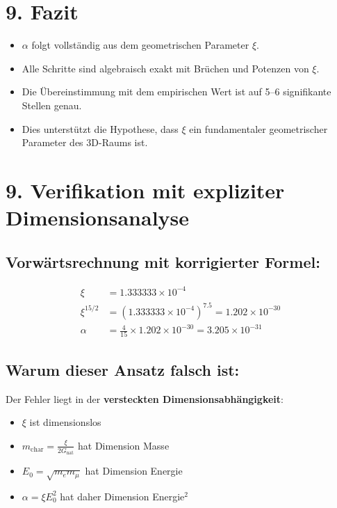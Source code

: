 \documentclass[12pt, a4paper]{article}
\begin{document}
\section*{9. Fazit}
\begin{itemize}
	\item $\alpha$ folgt vollständig aus dem geometrischen Parameter $\xi$.
	\item Alle Schritte sind algebraisch exakt mit Brüchen und Potenzen von $\xi$.
	\item Die Übereinstimmung mit dem empirischen Wert ist auf 5–6 signifikante Stellen genau.
	\item Dies unterstützt die Hypothese, dass $\xi$ ein fundamentaler geometrischer Parameter des 3D-Raums ist.
\end{itemize}
	
	\section*{9. Verifikation mit expliziter Dimensionsanalyse}
	
	\subsection*{Vorwärtsrechnung mit korrigierter Formel:}
	\begin{align*}
		\xi &= 1.333333 \times 10^{-4} \\
		\xi^{15/2} &= (1.333333 \times 10^{-4})^{7.5} = 1.202 \times 10^{-30} \\
		\alpha &= \frac{4}{15} \times 1.202 \times 10^{-30} = 3.205 \times 10^{-31}
	\end{align*}
	
	\subsection*{Warum dieser Ansatz falsch ist:}
	
	Der Fehler liegt in der \textbf{versteckten Dimensionsabhängigkeit}:
	
	\begin{itemize}
		\item $\xi$ ist dimensionslos
		\item $m_{\text{char}} = \frac{\xi}{2G_{\text{nat}}}$ hat Dimension Masse
		\item $E_0 = \sqrt{m_e m_\mu}$ hat Dimension Energie
		\item $\alpha = \xi E_0^2$ hat daher Dimension Energie$^2$
	\end{itemize}
	
\end{document}
